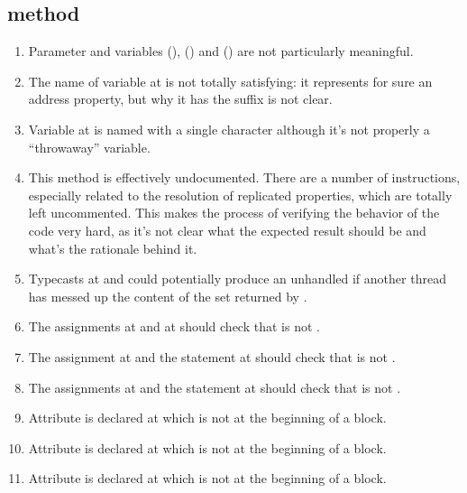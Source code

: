 \subsection{ method}
\begin{enumerate}
	\item {} Parameter  and variables  (),  () and  () are not particularly meaningful. 
	\item {} The name of variable  at  is not totally satisfying: it represents for sure an address property, but why it has the  suffix is not clear. 
	\item {} Variable  at  is named with a single character although it's not properly a “throwaway” variable. 
	\item {} This method is effectively undocumented. There are a number of instructions, especially related to the resolution of replicated properties, which are totally left uncommented. This makes the process of verifying the behavior of the code very hard, as it's not clear what the expected result should be and what's the rationale behind it. 
	\item {} Typecasts at  and  could potentially produce an unhandled  if another thread has messed up the content of the set returned by .
	\item {} The assignments at  and at  should check that  is not . 
	\item {} The assignment at  and the  statement at  should check that  is not .
	\item {} The assignments at  and the  statement at  should check that  is not .
	\item {} Attribute  is declared at  which is not at the beginning of a block. 
	\item {} Attribute  is declared at  which is not at the beginning of a block.
	\item {} Attribute  is declared at  which is not at the beginning of a block.

\end{enumerate}
